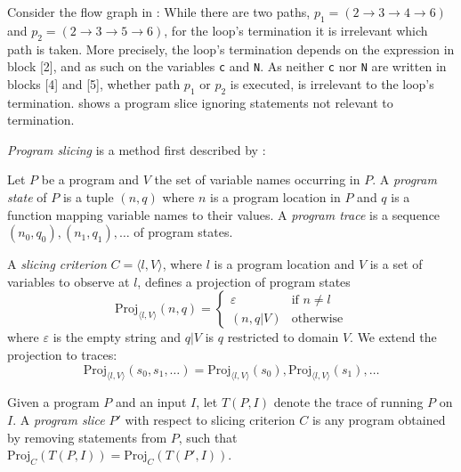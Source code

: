 \begin{example}
Consider the flow graph in : While there are two paths, $p_1 = (2 \rightarrow 3 \rightarrow 4 \rightarrow 6)$ and $p_2 = (2 \rightarrow 3 \rightarrow 5 \rightarrow 6)$, for the loop's termination it is irrelevant which path is taken. More precisely, the loop's termination depends on the expression in block [2], and as such on the variables \texttt{c} and \texttt{N}. As neither \texttt{c} nor \texttt{N} are written in blocks [4] and [5], whether path $p_1$ or $p_2$ is executed, is irrelevant to the loop's termination.  shows a program slice ignoring statements not relevant to termination.
\end{example}

\emph{Program slicing} is a method first described by \citeauthor{DBLP:conf/icse/Weiser81} \cite{DBLP:conf/icse/Weiser81}:

\begin{definition}
    Let $P$ be a program and $V$ the set of variable names occurring in $P$. A \emph{program state} of $P$ is a tuple $(n, q)$ where $n$ is a program location in $P$ and $q$ is a function mapping variable names to their values. A \emph{program trace} is a sequence $(n_0, q_0), (n_1, q_1), \dots$ of program states.
\end{definition}
\begin{definition}
    A \emph{slicing criterion} $C = \langle l, V \rangle$, where $l$ is a program location and $V$ is a set of variables to observe at $l$, defines a projection of program states \[
        \text{Proj}_{\langle l, V \rangle}(n, q) = \begin{cases}
            \varepsilon & \text{if } n \ne l \\
            (n, q|V) & \text{otherwise}
        \end{cases}
    \]
where $\varepsilon$ is the empty string and $q|V$ is $q$ restricted to domain $V$. We extend the projection to traces:
\[
    \text{Proj}_{\langle l, V \rangle}(s_0, s_1, \dots) = \text{Proj}_{\langle l, V \rangle}(s_0), \text{Proj}_{\langle l, V \rangle}(s_1), \dots
\]

Given a program $P$ and an input $I$, let $T(P, I)$ denote the trace of running $P$ on $I$. A \emph{program slice} $P'$ with respect to slicing criterion $C$ is any program obtained by removing statements from $P$, such that $\text{Proj}_C(T(P, I)) = \text{Proj}_C(T(P', I))$.
\end{definition}

